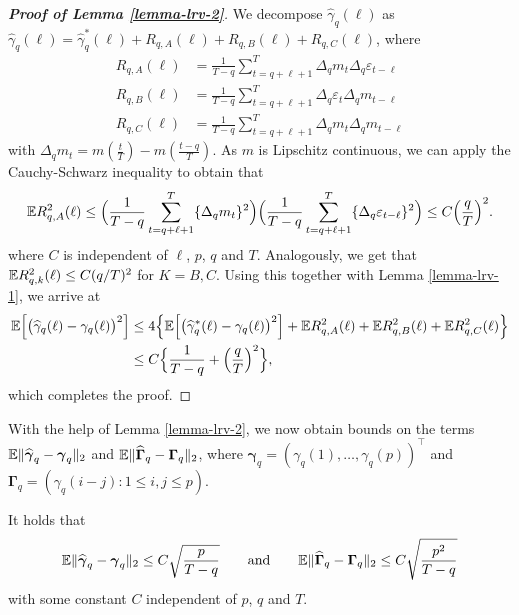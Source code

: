 \begin{proof}[\textnormal{\textbf{Proof of Lemma \ref{lemma-lrv-2}}}] 
We decompose $\widehat{\gamma}_q(\ell)$ as $\widehat{\gamma}_q(\ell) = \widehat{\gamma}_q^*(\ell) + R_{q,A}(\ell) + R_{q,B}(\ell) + R_{q,C}(\ell)$, where 
\begin{align*} 
R_{q,A}(\ell) & = \frac{1}{T-q} \sum_{t=q+\ell+1}^T \Delta_q m_t \Delta_q \varepsilon_{t-\ell} \\
R_{q,B}(\ell) & = \frac{1}{T-q} \sum_{t=q+\ell+1}^T \Delta_q \varepsilon_t \Delta_q m_{t-\ell} \\
R_{q,C}(\ell) & = \frac{1}{T-q} \sum_{t=q+\ell+1}^T \Delta_q m_t \Delta_q m_{t-\ell} 
\end{align*}
with $\Delta_q m_t = m(\frac{t}{T}) - m(\frac{t-q}{T})$. 
As $m$ is Lipschitz continuous, we can apply the Cauchy-Schwarz inequality to obtain that 
\[ \mathbb{E} R_{q,A}^2(\ell) \le  \Big( \frac{1}{T-q} \sum_{t=q+\ell+1}^T \{ \Delta_q m_t \}^2 \Big) \Big( \frac{1}{T-q} \sum_{t=q+\ell+1}^T \{ \Delta_q \varepsilon_{t-\ell} \}^2 \Big) \le C \Big( \frac{q}{T} \Big)^2. \]
where $C$ is independent of $\ell$, $p$, $q$ and $T$. Analogously, we get that $\mathbb{E} R_{q,k}^2(\ell) \le C (q/T)^2$ for $K = B,C$. Using this together with Lemma \ref{lemma-lrv-1}, we arrive at 
\begin{align*}
\mathbb{E} \Big[ \big( \widehat{\gamma}_q(\ell) - \gamma_q(\ell) \big)^2 \Big] 
 & \le 4 \Big\{ \mathbb{E} \Big[ \big( \widehat{\gamma}_q^*(\ell) - \gamma_q(\ell) \big)^2 \Big] + \mathbb{E} R_{q,A}^2(\ell) + \mathbb{E} R_{q,B}^2(\ell) + \mathbb{E} R_{q,C}^2(\ell) \Big\} \\
 & \le C \Big\{ \frac{1}{T-q} + \Big(\frac{q}{T}\Big)^2 \Big\}, 
\end{align*}
which completes the proof. 
\end{proof}


With the help of Lemma \ref{lemma-lrv-2}, we now obtain bounds on the terms $\mathbb{E} \| \widehat{\boldsymbol{\gamma}}_q - \boldsymbol{\gamma}_q \|_2$ and $\mathbb{E} \| \widehat{\boldsymbol{\Gamma}}_q - \boldsymbol{\Gamma}_q \|_2$, where $\boldsymbol{\gamma}_q = (\gamma_q(1),\dots,\gamma_q(p))^\top$ and $\boldsymbol{\Gamma}_q = (\gamma_q(i-j): 1 \le i,j \le p)$. 
\begin{lemmaA}\label{lemma-lrv-3}
It holds that 
\[ \mathbb{E} \| \widehat{\boldsymbol{\gamma}}_q - \boldsymbol{\gamma}_q \|_2 \le C \sqrt{\frac{p}{T-q}} \qquad \text{and} \qquad \mathbb{E} \| \widehat{\boldsymbol{\Gamma}}_q - \boldsymbol{\Gamma}_q \|_2 \le C \sqrt{\frac{p^2}{T-q}} \]
with some constant $C$ independent of $p$, $q$ and $T$. 
\end{lemmaA}


